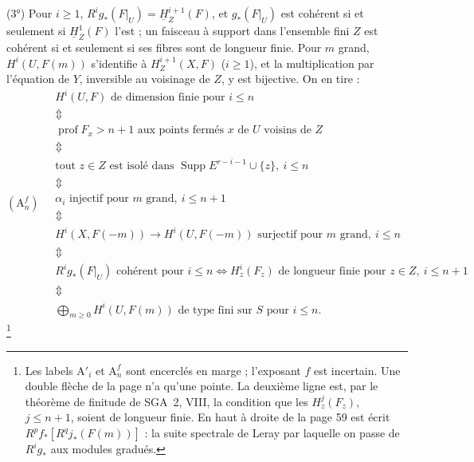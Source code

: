 \documentclass[11pt,a4paper]{article}
\begin{document}
(3°) Pour $i \geq 1$, $R^i g_*(F|_U) = \underline{H}^{i+1}_Z(F)$, et
$g_*(F|_U)$ est cohérent si et seulement si $\underline{H}^1_Z(F)$ l'est ; un
faisceau à support dans l'ensemble fini $Z$ est cohérent si et seulement si
ses fibres sont de longueur finie. Pour $m$ grand, $H^i(U, F(m))$ s'identifie à
$H^{i+1}_Z(X, F)$ ($i \geq 1$), et la multiplication par l'équation de $Y$,
inversible au voisinage de $Z$, y est bijective. On en tire :
\[
(\mathrm{A}^f_n) \quad
\begin{array}{l}
  H^i(U, F) \text{ de dimension finie pour } i \leq n \\
  \Updownarrow \\
  \operatorname{prof} F_x > n+1 \text{ aux points fermés } x \text{ de } U \text{ voisins de } Z \\
  \Updownarrow \\
  \text{tout } z \in Z \text{ est isolé dans } \operatorname{Supp} E^{r-i-1} \cup \lbrace z \rbrace,\ i \leq n \\
  \Updownarrow \\
  \alpha_i \text{ injectif pour } m \text{ grand},\ i \leq n+1 \\
  \Updownarrow \\
  H^i(X, F(-m)) \to H^i(U, F(-m)) \text{ surjectif pour } m \text{ grand},\ i \leq n \\
  \Updownarrow \\
  R^i g_*(F|_U) \text{ cohérent pour } i \leq n
  \iff H^i_z(F_z) \text{ de longueur finie pour } z \in Z,\ i \leq n+1 \\
  \Updownarrow \\
  \bigoplus_{m \geq 0} H^i(U, F(m)) \text{ de type fini sur } S \text{ pour } i \leq n .
\end{array}
\]
\footnote{Les labels $\mathrm{A}'_i$ et $\mathrm{A}^f_n$ sont encerclés en
marge ; l'exposant $f$ est incertain. Une double flèche de la page n'a qu'une
pointe. La deuxième ligne est, par le théorème de finitude de SGA~2, VIII, la
condition que les $H^j_z(F_z)$, $j \leq n+1$, soient de longueur finie. En haut à
droite de la page 59 est écrit $R^p f_* [R^q j_* (F(m))]$ : la suite
spectrale de Leray par laquelle on passe de $R^i g_*$ aux modules gradués.}
\end{document}
